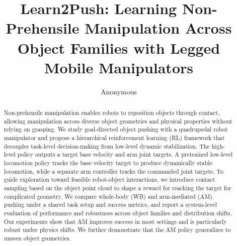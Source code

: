 \documentclass[letterpaper, 10 pt, conference]{ieeeconf}  %
\title{\LARGE \bf
Learn2Push: Learning Non-Prehensile Manipulation Across Object Families with Legged Mobile Manipulators}
\author{Anonymous}
\begin{document}
\maketitle




\thispagestyle{empty}
\pagestyle{empty}

\begin{abstract}

Non-prehensile manipulation enables robots to reposition objects through contact, allowing manipulation across diverse object geometries and physical properties without relying on grasping. We study goal-directed object pushing with a quadrupedal robot manipulator and propose a hierarchical reinforcement learning (RL) framework that decouples task-level decision-making from low-level dynamic stabilization. The high-level policy outputs a target base velocity and arm joint targets. A pretrained low-level locomotion policy tracks the base velocity target to produce dynamically stable locomotion, while a separate arm controller tracks the commanded joint targets. To guide exploration toward feasible robot-object interactions, we introduce contact sampling based on the object point cloud to shape a reward for reaching the target for complicated geometry. We compare whole-body (WB) and arm-mediated (AM) pushing under a shared task setup and success metrics, and report a system-level evaluation of performance and robustness across object families and distribution shifts. Our experiments show that AM improves success in most settings and is particularly robust under physics shifts. We further demonstrate that the AM policy generalizes to unseen object geometries.







\end{abstract}
\end{document}
